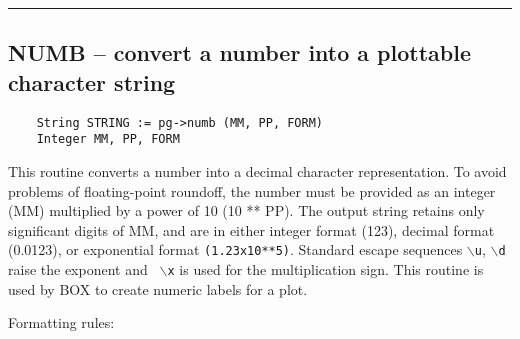 \hrule

\subsection*{NUMB -- convert a number into a plottable character string }

\begin{verbatim}
    String STRING := pg->numb (MM, PP, FORM)
    Integer MM, PP, FORM
\end{verbatim}

This routine converts a number into a decimal character
representation.  To avoid problems of floating-point roundoff, the
number must be provided as an integer (MM) multiplied by a power of 10
(10 ** PP).  The output string retains only significant digits of MM,
and are in either integer format (123), decimal format (0.0123),
or exponential format {\tt (1.23x10**5)}.  Standard escape sequences
{\tt $\backslash$u}, {\tt $\backslash$d} raise the exponent and {\tt
$\backslash$x} is used for the multiplication sign.  This routine is
used by BOX to create numeric labels for a plot.

Formatting rules:

